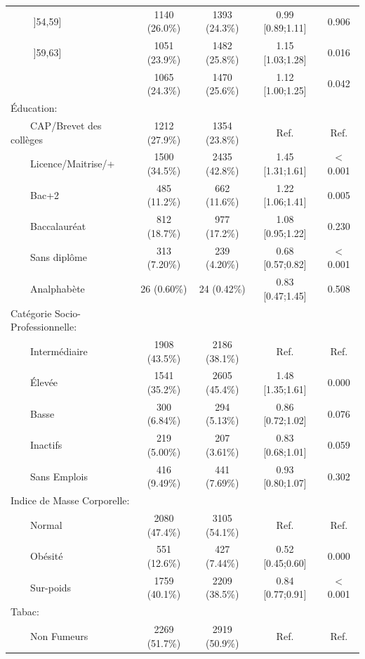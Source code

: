 \documentclass{book}
\begin{document}
\begin{longtable}{lcccc}
$\qquad$ ]54,59] & 1140 (26.0\%) & 1393 (24.3\%) & 0.99 [0.89;1.11] &  0.906 \\ 
$\qquad$ ]59,63] & 1051 (23.9\%) & 1482 (25.8\%) & 1.15 [1.03;1.28] &  0.016 \\ 
$\qquad$ $\>$ & 1065 (24.3\%) & 1470 (25.6\%) & 1.12 [1.00;1.25] &  0.042 \\ 
Éducation: &              &              &                  &        \\ 
$\qquad$CAP/Brevet des collèges & 1212 (27.9\%) & 1354 (23.8\%) &       Ref.       &  Ref.  \\ 
$\qquad$Licence/Maitrise/+ & 1500 (34.5\%) & 2435 (42.8\%) & 1.45 [1.31;1.61] & $<$0.001 \\ 
$\qquad$Bac+2 & 485 (11.2\%)  & 662 (11.6\%)  & 1.22 [1.06;1.41] &  0.005 \\ 
$\qquad$Baccalauréat & 812 (18.7\%)  & 977 (17.2\%)  & 1.08 [0.95;1.22] &  0.230 \\ 
$\qquad$Sans diplôme & 313 (7.20\%)  & 239 (4.20\%)  & 0.68 [0.57;0.82] & $<$0.001 \\ 
$\qquad$Analphabète &  26 (0.60\%)  &  24 (0.42\%)  & 0.83 [0.47;1.45] &  0.508 \\ 
Catégorie Socio-Professionnelle: &              &              &                  &        \\ 
$\qquad$Intermédiaire & 1908 (43.5\%) & 2186 (38.1\%) &       Ref.       &  Ref.  \\ 
$\qquad$Élevée & 1541 (35.2\%) & 2605 (45.4\%) & 1.48 [1.35;1.61] &  0.000 \\ 
$\qquad$Basse & 300 (6.84\%)  & 294 (5.13\%)  & 0.86 [0.72;1.02] &  0.076 \\ 
$\qquad$Inactifs & 219 (5.00\%)  & 207 (3.61\%)  & 0.83 [0.68;1.01] &  0.059 \\ 
$\qquad$Sans Emplois & 416 (9.49\%)  & 441 (7.69\%)  & 0.93 [0.80;1.07] &  0.302 \\ 
Indice de Masse Corporelle: &              &              &                  &        \\ 
$\qquad$Normal & 2080 (47.4\%) & 3105 (54.1\%) &       Ref.       &  Ref.  \\ 
$\qquad$Obésité & 551 (12.6\%)  & 427 (7.44\%)  & 0.52 [0.45;0.60] &  0.000 \\ 
$\qquad$Sur-poids & 1759 (40.1\%) & 2209 (38.5\%) & 0.84 [0.77;0.91] & $<$0.001 \\ 
Tabac: &              &              &                  &        \\ 
$\qquad$Non Fumeurs & 2269 (51.7\%) & 2919 (50.9\%) &       Ref.       &  Ref.  \\ 

\end{longtable}
\end{document}
